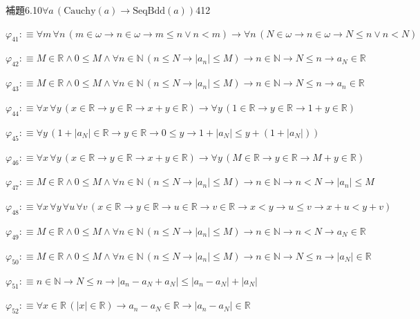 \begin{fullproof}{補題6.10}{$\forall a\,(\mathrm{Cauchy}(a) \to \mathrm{SeqBdd}(a))$}{412}
\begin{abbrevlist}
\item $\varphi_{41} :\equiv \forall m\,\forall n\,(m \in \omega \to n \in \omega \to m \leq n \lor n < m) \to \forall n\,(N \in \omega \to n \in \omega \to N \leq n \lor n < N)$
\item $\varphi_{42} :\equiv M \in \mathbb{R} \land 0 \leq M \land \forall n \in \mathbb{N}\,(n \leq N \to \lvert a_{n} \rvert \leq M) \to n \in \mathbb{N} \to N \leq n \to a_{N} \in \mathbb{R}$
\item $\varphi_{43} :\equiv M \in \mathbb{R} \land 0 \leq M \land \forall n \in \mathbb{N}\,(n \leq N \to \lvert a_{n} \rvert \leq M) \to n \in \mathbb{N} \to N \leq n \to a_{n} \in \mathbb{R}$
\item $\varphi_{44} :\equiv \forall x\,\forall y\,(x \in \mathbb{R} \to y \in \mathbb{R} \to x + y \in \mathbb{R}) \to \forall y\,(1 \in \mathbb{R} \to y \in \mathbb{R} \to 1 + y \in \mathbb{R})$
\item $\varphi_{45} :\equiv \forall y\,(1 + \lvert a_{N} \rvert \in \mathbb{R} \to y \in \mathbb{R} \to 0 \leq y \to 1 + \lvert a_{N} \rvert \leq y + (1 + \lvert a_{N} \rvert))$
\item $\varphi_{46} :\equiv \forall x\,\forall y\,(x \in \mathbb{R} \to y \in \mathbb{R} \to x + y \in \mathbb{R}) \to \forall y\,(M \in \mathbb{R} \to y \in \mathbb{R} \to M + y \in \mathbb{R})$
\item $\varphi_{47} :\equiv M \in \mathbb{R} \land 0 \leq M \land \forall n \in \mathbb{N}\,(n \leq N \to \lvert a_{n} \rvert \leq M) \to n \in \mathbb{N} \to n < N \to \lvert a_{n} \rvert \leq M$
\item $\varphi_{48} :\equiv \forall x\,\forall y\,\forall u\,\forall v\,(x \in \mathbb{R} \to y \in \mathbb{R} \to u \in \mathbb{R} \to v \in \mathbb{R} \to x < y \to u \leq v \to x + u < y + v)$
\item $\varphi_{49} :\equiv M \in \mathbb{R} \land 0 \leq M \land \forall n \in \mathbb{N}\,(n \leq N \to \lvert a_{n} \rvert \leq M) \to n \in \mathbb{N} \to n < N \to a_{N} \in \mathbb{R}$
\item $\varphi_{50} :\equiv M \in \mathbb{R} \land 0 \leq M \land \forall n \in \mathbb{N}\,(n \leq N \to \lvert a_{n} \rvert \leq M) \to n \in \mathbb{N} \to N \leq n \to \lvert a_{N} \rvert \in \mathbb{R}$
\item $\varphi_{51} :\equiv n \in \mathbb{N} \to N \leq n \to \lvert a_{n} - a_{N} + a_{N} \rvert \leq \lvert a_{n} - a_{N} \rvert + \lvert a_{N} \rvert$
\item $\varphi_{52} :\equiv \forall x \in \mathbb{R}\,(\lvert x \rvert \in \mathbb{R}) \to a_{n} - a_{N} \in \mathbb{R} \to \lvert a_{n} - a_{N} \rvert \in \mathbb{R}$

\end{abbrevlist}
\end{fullproof}
